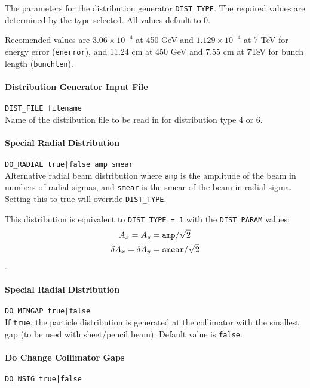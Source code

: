 The parameters for the distribution generator \texttt{DIST\_TYPE}.
The required values are determined by the type selected.
All values default to 0.

Recomended values are $3.06 \times 10^{-4}$ at 450 GeV and $1.129 \times 10^{-4}$ at 7 TeV for energy error (\texttt{enerror}), and 11.24 cm at 450 GeV and 7.55 cm at 7TeV for bunch length (\texttt{bunchlen}).

\paragraph{Distribution Generator Input File} \texttt{DIST\_FILE filename}\\

Name of the distribution file to be read in for distribution type 4 or 6.

\paragraph{Special Radial Distribution} \texttt{DO\_RADIAL true|false amp smear}\\

Alternative radial beam distribution where \texttt{amp} is the amplitude of the beam in numbers of radial sigmas, and \texttt{smear} is the smear of the beam in radial sigma.
Setting this to true will override \texttt{DIST\_TYPE}.

This distribution is equivalent to \texttt{DIST\_TYPE = 1} with the \texttt{DIST\_PARAM} values:
\begin{align*}
   A_x = A_y &= \mbox{\texttt{amp}}/\sqrt{2}\\
   \delta A_x = \delta A_y &= \mbox{\texttt{smear}}/\sqrt{2}
\end{align*}.

\paragraph{Special Radial Distribution} \texttt{DO\_MINGAP true|false}\\

If \texttt{true}, the particle distribution is generated at the collimator with the smallest gap (to be used with sheet/pencil beam).
Default value is \texttt{false}.

\paragraph{Do Change Collimator Gaps} \texttt{DO\_NSIG true|false}\\

